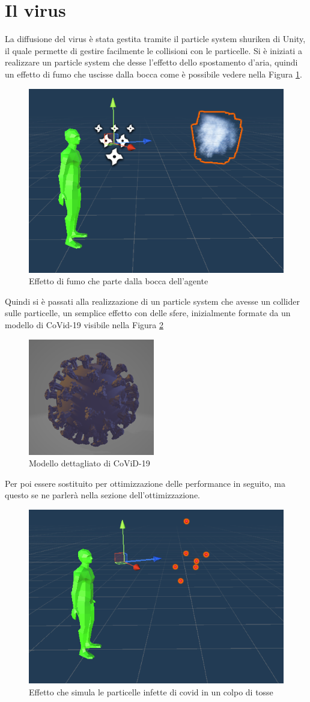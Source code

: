 \documentclass[12pt, openany]{book}
\begin{document}
 	\section{Il virus}
 	La diffusione del virus è stata gestita tramite il particle system shuriken di Unity, il quale permette di gestire facilmente le collisioni con le particelle. Si è iniziati a realizzare un particle system che desse l'effetto dello spostamento d'aria, quindi un effetto di fumo che uscisse dalla bocca come è possibile vedere nella Figura \ref{fig:SmokeEffect}.
 	\begin{figure}[H]
 		\centering
 		\includegraphics[width=0.5\linewidth]{"Immagini/SmokeEffect.png"}
 		\caption{Effetto di fumo che parte dalla bocca dell'agente}
 		\label{fig:SmokeEffect}
 	\end{figure}
 	Quindi si è passati alla realizzazione di un particle system che avesse un collider sulle particelle, un semplice effetto con delle sfere, inizialmente formate da un modello di CoVid-19 visibile nella Figura \ref{fig:Covid}
 	\begin{figure}[H]
 		\centering
 		\includegraphics[width=0.5\linewidth]{"Immagini/Covid.png"}
 		\caption{Modello dettagliato di CoViD-19}
 		\label{fig:Covid}
 	\end{figure}
 	Per poi essere sostituito per ottimizzazione delle performance in seguito, ma questo se ne parlerà nella sezione dell'ottimizzazione.
 	\begin{figure}[H]
 		\centering
 		\includegraphics[width=0.5\linewidth]{"Immagini/CovidEffect.png"}
 		\caption{Effetto che simula le particelle infette di covid in un colpo di tosse}
 		\label{fig:CovidEffect}
 	\end{figure}
\end{document}
